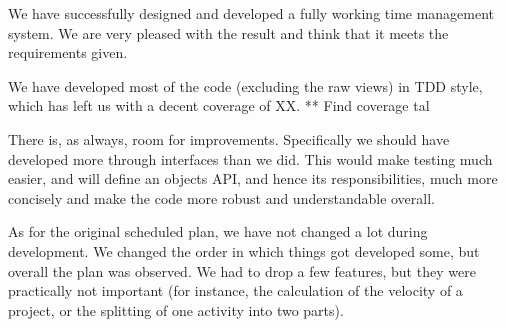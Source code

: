 We have successfully designed and developed a fully working time management system. We are very pleased with the result and think that it meets the requirements given. 

We have developed most of the code (excluding the raw views) in TDD style, which has left us with a decent coverage of XX. ** Find coverage tal

There is, as always, room for improvements. Specifically we should have developed more through interfaces than we did. This would make testing much easier, and will define an objects API, and hence its responsibilities, much more concisely and make the code more robust and understandable overall.

As for the original scheduled plan, we have not changed a lot during development. We changed the order in which things got developed some, but overall the plan was observed. We had to drop a few features, but they were practically not important (for instance, the calculation of the velocity of a project, or the splitting of one activity into two parts).
